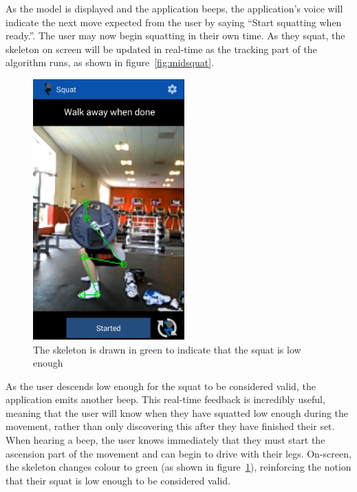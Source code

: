 As the model is displayed and the application beeps, the application's voice will indicate the next move expected from the user by saying ``Start squatting when ready.''. The user may now begin squatting in their own time. As they squat, the skeleton on screen will be updated in real-time as the tracking part of the algorithm runs, as shown in figure~\ref{fig:midsquat}.

\begin{figure}[H]
    \centering
	\includegraphics[height=10cm]{application/images/belowparallel}
\caption{The skeleton is drawn in green to indicate that the squat is low enough}
\label{fig:belowparallel}
\end{figure}

As the user descends low enough for the squat to be considered valid, the application emits another beep. This real-time feedback is incredibly useful, meaning that the user will know when they have squatted low enough during the movement, rather than only discovering this after they have finished their set. When hearing a beep, the user knows immediately that they must start the ascension part of the movement and can begin to drive with their legs. On-screen, the skeleton changes colour to green (as shown in figure~\ref{fig:belowparallel}), reinforcing the notion that their squat is low enough to be considered valid.

